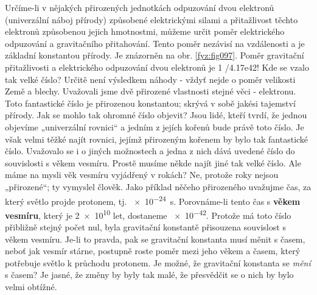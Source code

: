     Určíme-li v nějakých přirozených jednotkách odpuzování dvou elektronů (univerzální náboj 
    přírody) způsobené elektrickými silami a přitažlivost těchto elektronů způsobenou jejich 
    hmotnostmi, můžeme určit poměr elektrického odpuzování a gravitačního přitahování. Tento poměr 
    nezávisí na vzdálenosti a je základní konstantou přírody. Je znázorněn na obr. 
    \ref{fyz:fig097}. Poměr gravitační přitažlivosti a elektrického odpuzování dvou elektronů je 
    \num{1 /4.17e42}! Kde se vzalo tak velké číslo? Určitě není výsledkem náhody - vždyť nejde o 
    poměr velikosti Země a blechy. Uvažovali jsme dvě přirozené vlastnosti stejné věci - elektronu. 
    Toto fantastické číslo je přirozenou konstantou; skrývá v sobě jakési tajemství přírody. Jak se 
    mohlo tak ohromné číslo objevit? Jsou lidé, kteří tvrdí, že jednou objevíme „univerzální 
    rovnici“ a jedním z jejích kořenů bude právě toto číslo. Je však velmi těžké najít rovnici, 
    jejímž přirozeným kořenem by bylo tak fantastické číslo. Uvažovalo se i o jiných možnostech a 
    jedna z nich dává uvedené číslo do souvislosti s věkem vesmíru. Prostě musíme někde najít jiné 
    tak velké číslo. Ale máme na mysli věk vesmíru vyjádřený v rokách? Ne, protože roky nejsou 
    „přirozené“; ty vymyslel člověk. Jako příklad něčeho přirozeného uvažujme čas, za který světlo 
    projde protonem, tj. \SI{e-24}{\s}. Porovnáme-li tento čas s \textbf{věkem vesmíru}, který je 
    \num{2e10} let, dostaneme \num{e-42}. Protože má toto číslo přibližně stejný počet nul, byla 
    gravitační konstantě přisouzena souvislost s věkem vesmíru. Je-li to pravda, pak se gravitační 
    konstanta musí měnit s časem, neboť jak vesmír stárne, postupně roste poměr mezi jeho věkem a 
    časem, který potřebuje světlo k průchodu protonem. Je možné, že gravitační konstanta se 
    \emph{mění} s časem? Je jasné, že změny by byly tak malé, že přesvědčit se o nich by bylo velmi 
    obtížné.
    
